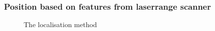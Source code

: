 

\subsubsection{Position based on features from laserrange scanner}

\begin{figure}
  
  \caption{The localisation method}
  \label{fig:localisation}
\end{figure}

